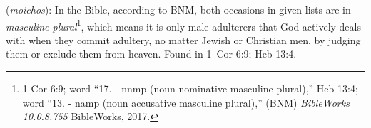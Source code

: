 \item[Adulterer,]

(\textit{moichos}):
In the Bible, according to BNM, both occasions in given lists are in \emph{masculine plural}\footnote{1 Cor 6:9; word ``17.  - nnmp (noun nominative masculine plural),'' Heb 13:4; word ``13.  - namp (noun accusative masculine plural),'' (BNM) \emph{BibleWorks 10.0.8.755} BibleWorks, 2017.}, which means it is only male adulterers that God actively deals with when they commit adultery, no matter Jewish or Christian men, by judging them or exclude them from heaven. 
Found in 1~Cor 6:9; Heb 13:4.

